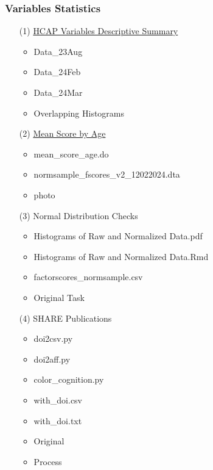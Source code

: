 \documentclass[12pt]{article}
\begin{document}
\subsubsection{Variables Statistics}
\begin{itemize}
    \item[(1)] \href{https://github.com/rnj0nes/HCAP22/tree/main/CFA-HCAP}{HCAP Variables Descriptive Summary}
    \begin{itemize}
       \item Data\_23Aug
       \item Data\_24Feb
       \item Data\_24Mar
       \item Overlapping Histograms
    \end{itemize}
    \item[(2)] \href{https://rpubs.com/mbounthavong/964058}{Mean Score by Age}
    \begin{itemize}
        \item mean\_score\_age.do
        \item normsample\_fscores\_v2\_12022024.dta
        \item photo
    \end{itemize}
    \item[(3)] Normal Distribution Checks
    \begin{itemize}
        \item Histograms of Raw and Normalized Data.pdf
        \item Histograms of Raw and Normalized Data.Rmd
        \item factorscores\_normsample.csv
        \item Original Task
    \end{itemize}
    \item[(4)] SHARE Publications
    \begin{itemize}
        \item doi2csv.py
        \item doi2aff.py
        \item color\_cognition.py
        \item with\_doi.csv
        \item with\_doi.txt
        \item Original
        \item Process
    \end{itemize}
\end{itemize}
\end{document}
